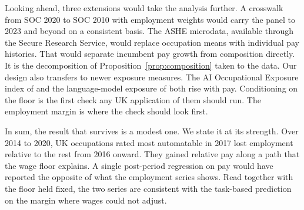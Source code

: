 \documentclass[12pt,leqno]{article}
\begin{document}
Looking ahead, three extensions would take the analysis further. A crosswalk from SOC 2020 to SOC 2010 with employment weights would carry the panel to 2023 and beyond on a consistent basis. The ASHE microdata, available through the Secure Research Service, would replace occupation means with individual pay histories. That would separate incumbent pay growth from composition directly. It is the decomposition of Proposition~\ref{prop:composition} taken to the data. Our design also transfers to newer exposure measures. The AI Occupational Exposure index of \citet{felten2021occupational} and the language-model exposure of \citet{eloundou2024gpts} both rise with pay. Conditioning on the floor is the first check any UK application of them should run. The employment margin is where the check should look first.

In sum, the result that survives is a modest one. We state it at its strength. Over 2014 to 2020, UK occupations rated most automatable in 2017 lost employment relative to the rest from 2016 onward. They gained relative pay along a path that the wage floor explains. A single post-period regression on pay would have reported the opposite of what the employment series shows. Read together with the floor held fixed, the two series are consistent with the task-based prediction on the margin where wages could not adjust.
\end{document}
